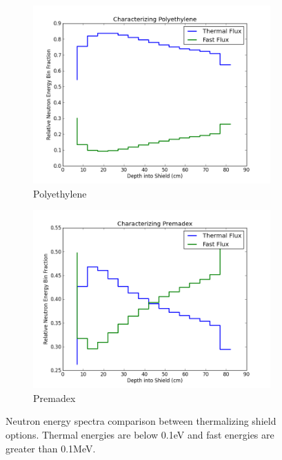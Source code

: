 \documentclass{mc2015}
\begin{document}
\begin{figure}
	\centering
	\begin{subfigure}{0.49\textwidth}
		\includegraphics[width=\textwidth]{Poly_char.png}
		\caption{Polyethylene}
		\label{fig:polychar}
	\end{subfigure}
	\begin{subfigure}{0.49\textwidth}
		\includegraphics[width=\textwidth]{Prem_char.png}
		\caption{Premadex}
		\label{fig:premchar}
	\end{subfigure}
	\caption{Neutron energy spectra comparison between thermalizing shield options. Thermal energies are below 0.1eV and fast energies are greater than 0.1MeV.}
	\label{fig:chars}
\end{figure}
\end{document}
